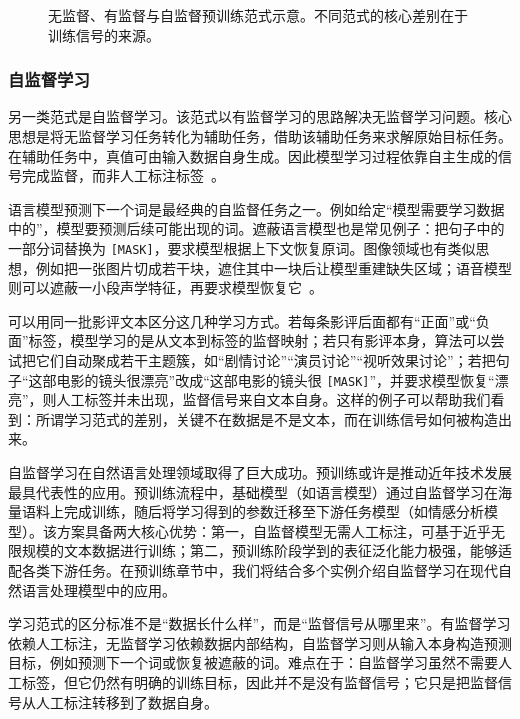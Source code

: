 \begin{figure}[htbp]
  \centering
  
  \caption{无监督、有监督与自监督预训练范式示意。不同范式的核心差别在于训练信号的来源。}
  \label{fig:nlpbook-learning-paradigms}
\end{figure}

\subsubsection{自监督学习}
另一类范式是自监督学习。该范式以有监督学习的思路解决无监督学习问题。核心思想是将无监督学习任务转化为辅助任务，借助该辅助任务来求解原始目标任务。在辅助任务中，真值可由输入数据自身生成。因此模型学习过程依靠自主生成的信号完成监督，而非人工标注标签~\cite{BengioEtAl2013Representation}。


语言模型预测下一个词是最经典的自监督任务之一。例如给定“模型需要学习数据中的”，模型要预测后续可能出现的词。遮蔽语言模型也是常见例子：把句子中的一部分词替换为 \texttt{[MASK]}，要求模型根据上下文恢复原词。图像领域也有类似思想，例如把一张图片切成若干块，遮住其中一块后让模型重建缺失区域；语音模型则可以遮蔽一小段声学特征，再要求模型恢复它~\cite{DevlinEtAl2019BERT,HeEtAl2022MAE,BaevskiEtAl2020Wav2vec}。

可以用同一批影评文本区分这几种学习方式。若每条影评后面都有“正面”或“负面”标签，模型学习的是从文本到标签的监督映射；若只有影评本身，算法可以尝试把它们自动聚成若干主题簇，如“剧情讨论”“演员讨论”“视听效果讨论”；若把句子“这部电影的镜头很漂亮”改成“这部电影的镜头很 \texttt{[MASK]}”，并要求模型恢复“漂亮”，则人工标签并未出现，监督信号来自文本自身。这样的例子可以帮助我们看到：所谓学习范式的差别，关键不在数据是不是文本，而在训练信号如何被构造出来。


自监督学习在自然语言处理领域取得了巨大成功。预训练或许是推动近年技术发展最具代表性的应用。预训练流程中，基础模型（如语言模型）通过自监督学习在海量语料上完成训练，随后将学习得到的参数迁移至下游任务模型（如情感分析模型）。该方案具备两大核心优势：第一，自监督模型无需人工标注，可基于近乎无限规模的文本数据进行训练；第二，预训练阶段学到的表征泛化能力极强，能够适配各类下游任务。在预训练章节中，我们将结合多个实例介绍自监督学习在现代自然语言处理模型中的应用。



\begin{importantnote}
  学习范式的区分标准不是“数据长什么样”，而是“监督信号从哪里来”。有监督学习依赖人工标注，无监督学习依赖数据内部结构，自监督学习则从输入本身构造预测目标，例如预测下一个词或恢复被遮蔽的词。难点在于：自监督学习虽然不需要人工标签，但它仍然有明确的训练目标，因此并不是没有监督信号；它只是把监督信号从人工标注转移到了数据自身。
\end{importantnote}
 
